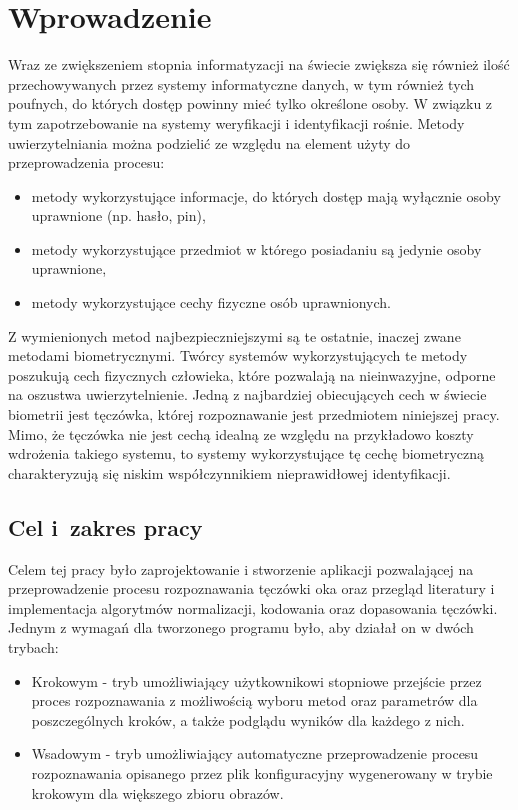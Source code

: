 \documentclass[10pt,polish,a4paper,oneside]{ppfcmthesis}
\begin{document}
\pagestyle{ppfcmthesis}\tableofcontents* \cleardoublepage 

\mainmatter \chapter{Wprowadzenie}



Wraz ze zwiększeniem stopnia informatyzacji na świecie zwiększa się również iloś\'c przechowywanych przez
systemy informatyczne danych, w tym również tych poufnych, do których dostęp powinny mie\'c tylko
określone osoby. W związku z tym zapotrzebowanie na systemy weryfikacji i identyfikacji rośnie. Metody
uwierzytelniania można podzieli\'c ze względu na element użyty do przeprowadzenia procesu:

\begin{itemize}
  \item metody wykorzystujące informacje, do których dostęp mają wyłącznie osoby uprawnione (np. hasło, pin),
  \item metody wykorzystujące przedmiot w którego posiadaniu są jedynie osoby uprawnione,
  \item metody wykorzystujące cechy fizyczne osób uprawnionych.
\end{itemize}

Z wymienionych metod najbezpieczniejszymi są te ostatnie, inaczej zwane metodami biometrycznymi.
Twórcy systemów wykorzystujących te metody poszukują cech fizycznych człowieka, które pozwalają na
nieinwazyjne, odporne na oszustwa uwierzytelnienie. Jedną z najbardziej obiecujących cech
w świecie biometrii jest tęczówka, której rozpoznawanie jest przedmiotem niniejszej pracy. Mimo, że
tęczówka nie jest cechą idealną ze względu na przykładowo koszty wdrożenia takiego systemu,
to systemy wykorzystujące tę cechę biometryczną charakteryzują się niskim współczynnikiem nieprawidłowej
identyfikacji.

\section{Cel i~zakres pracy}

Celem tej pracy było zaprojektowanie i stworzenie aplikacji pozwalającej na przeprowadzenie procesu
rozpoznawania tęczówki oka oraz przegląd literatury i implementacja algorytmów normalizacji,
kodowania oraz dopasowania tęczówki. Jednym z wymagań dla tworzonego programu było, aby działał
on w dwóch trybach:

\begin{itemize}
    \item Krokowym - tryb umożliwiający użytkownikowi stopniowe przejście przez proces rozpoznawania
    z możliwością wyboru metod oraz parametrów dla poszczególnych kroków, a także podglądu wyników dla
    każdego z nich.

    \item Wsadowym - tryb umożliwiający automatyczne przeprowadzenie procesu rozpoznawania opisanego przez
    plik konfiguracyjny wygenerowany w trybie krokowym dla większego zbioru obrazów.
\end{itemize}
\end{document}
